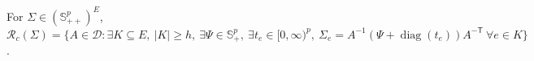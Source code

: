 For \(\Sigma\in(\mathbb S_{++}^{p})^{E}\), \(\mathcal R_c(\Sigma)=\{A\in\mathcal D:\exists K\subseteq E,\ |K|\ge h,\ \exists\Psi\in\mathbb S_{+}^p,\ \exists t_e\in[0,\infty)^p,\ \Sigma_e=A^{-1}(\Psi+\operatorname{diag}(t_e))A^{-\mathsf T}\ \forall e\in K\}\).